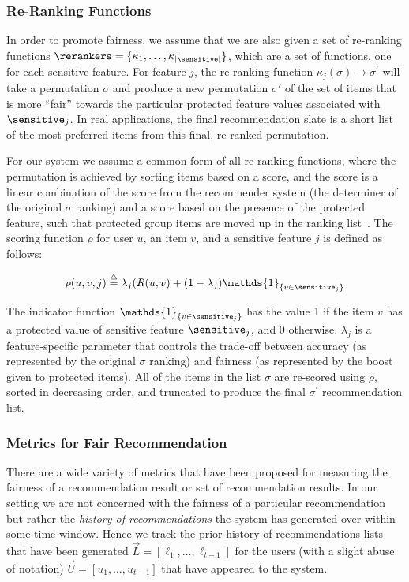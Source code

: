 \subsubsection{Re-Ranking Functions}
In order to promote fairness, we assume that we are also given a set of re-ranking functions $\rerankers = \{\kappa_1, \ldots, \kappa_{|\sensitive|}\}$, which are a set of functions, one for each sensitive feature. For feature $j$, the re-ranking function $\kappa_j(\sigma) \rightarrow \sigma^{\prime}$ will take a permutation $\sigma$ and produce a new permutation $\sigma'$ of the set of items that is more ``fair'' towards the particular protected feature values associated with $\sensitive_j$. In real applications, the final recommendation slate is a short list of the most preferred items from this final, re-ranked permutation. 

For our system we assume a common form of all re-ranking functions, where the permutation is achieved by sorting items based on a score, and the score is a linear combination of the score from the recommender system (the determiner of the original $\sigma$ ranking) and a score based on the presence of the protected feature, such that protected group items are moved up in the ranking list~\cite{adomavicius2009improving}. The scoring function $\rho$ for user $u$, an item $v$, and a sensitive feature $j$ is defined as follows:

\begin{equation}
    \rho(u, v, j) \buildrel\triangle\over= \lambda_j  (R(u,v) + (1 - \lambda_j) \mathds{1}_{\{v \in \sensitive_j\}}
\end{equation}


\noindent The indicator function $\mathds{1}_{\{v \in \sensitive_j\}}$ has the value 1 if the item $v$ has a protected value of sensitive feature $\sensitive_j$, and 0 otherwise. $\lambda_j$ is a feature-specific parameter that controls the trade-off between accuracy (as represented by the original $\sigma$ ranking) and fairness (as represented by the boost given to protected items). All of the items in the list $\sigma$ are re-scored using $\rho$, sorted in decreasing order, and truncated to produce the final $\sigma^{\prime}$ recommendation list.

\subsubsection{Metrics for Fair Recommendation}
There are a wide variety of metrics that have been proposed for measuring the fairness of a recommendation result or set of recommendation results.  In our setting we are not concerned with the fairness of a particular recommendation but rather the \emph{history of recommendations} the system has generated over within some time window.  Hence we track the prior history of recommendations lists that have been generated $\vec{L} = [\ell_1, \ldots, \ell_{t-1}]$ for the users (with a slight abuse of notation) $\vec{U} = [u_1, \ldots, u_{t-1} ]$ that have appeared to the system.  

